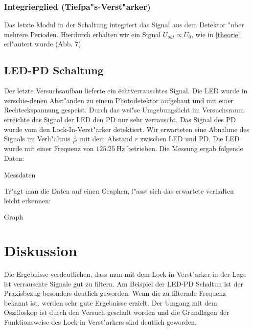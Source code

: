 \documentclass{scrartcl}
\begin{document}
			\subsubsection{Integrierglied (Tiefpa"s-Verst"arker)}

				Das letzte Modul in der Schaltung integriert das Signal aus dem Detektor "uber mehrere Perioden.
				Hierdurch erhalten wir ein Signal $U_{out} \propto U_0$, wie in \ref{theorie} erl"autert wurde (Abb. 7).

		\subsection{LED-PD Schaltung}

			Der letzte Versuchsaufbau lieferte ein \"echt\" verrauschtes Signal.
			Die LED wurde in verschie-denen Abst"anden zu einem Photodetektor aufgebaut und mit einer Rechteckspannung gespeist.
			Durch das wei"se Umgebungslicht im Versuchsraum erreichte das Signal der LED den PD nur sehr verrauscht.
			Das Signal des PD wurde vom den Lock-In-Verst"arker detektiert.
			Wir erwarteten eine Abnahme des Signals im Verh"altnis $\frac{1}{r^2}$ mit dem Abstand $r$ zwischen LED und PD.
			Die LED wurde mit einer Frequenz von $\SI{125,25}{\hertz}$ betrieben. Die Messung ergab folgende Daten:


			Messdaten


			Tr"agt man die Daten auf einen Graphen, l"asst sich das erwartete verhalten leicht erkennen:


			Graph


	\section{Diskussion}

		Die Ergebnisse verdeutlichen, dass man mit dem Lock-in Verst"arker in der Lage ist verrauschte Signale gut zu filtern.
		Am Beispiel der LED-PD Schaltun ist der Praxisbezug besonders deutlich geworden. Wenn die zu filternde Frequenz bekannt ist, 
		werden sehr gute Ergebnisse erzielt. Der Umgang mit dem Oszilloskop ist durch den Versuch geschult worden und die Grundlagen
		der Funktionsweise des Lock-in Verst"arkers sind deutlich geworden.
\end{document}
